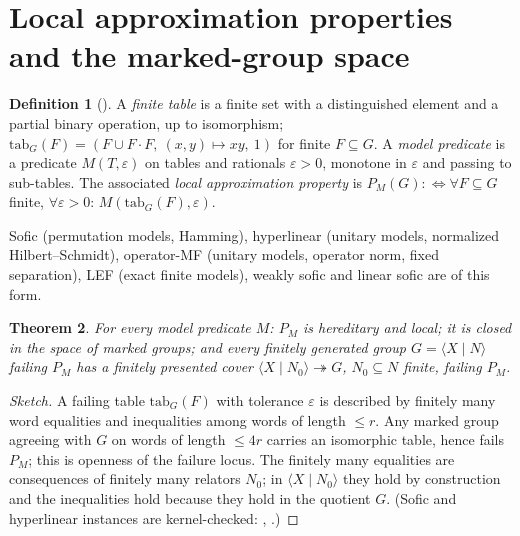 \documentclass[11pt]{article}
\newtheorem{theorem}{Theorem}[section]
\theoremstyle{definition}
\newtheorem{definition}[theorem]{Definition}
\begin{document}
\section{Local approximation properties and the marked-group space}
\begin{definition}[]
A \emph{finite table} is a finite set with a distinguished element and a partial binary operation, up to isomorphism; $\mathrm{tab}_G(F)=(F\cup F\!\cdot\! F,\ (x,y)\mapsto xy,\ 1)$ for finite $F\subseteq G$. A \emph{model predicate} is a predicate $M(T,\varepsilon)$ on tables and rationals $\varepsilon>0$, monotone in $\varepsilon$ and passing to sub-tables. The associated \emph{local approximation property} is $P_M(G):\iff \forall F\subseteq G$ finite, $\forall \varepsilon>0$: $M(\mathrm{tab}_G(F),\varepsilon)$.
\end{definition}
Sofic (permutation models, Hamming), hyperlinear (unitary models, normalized Hilbert--Schmidt), operator-MF (unitary models, operator norm, fixed separation), LEF (exact finite models), weakly sofic and linear sofic are of this form.
\begin{theorem}\label{thm:closed}
For every model predicate $M$: $P_M$ is hereditary and local; it is closed in the space of marked groups; and every finitely generated group $G=\langle X\mid N\rangle$ failing $P_M$ has a finitely presented cover $\langle X\mid N_0\rangle\twoheadrightarrow G$, $N_0\subseteq N$ finite, failing $P_M$.
\end{theorem}
\begin{proof}[Sketch]
A failing table $\mathrm{tab}_G(F)$ with tolerance $\varepsilon$ is described by finitely many word equalities and inequalities among words of length $\le r$. Any marked group agreeing with $G$ on words of length $\le 4r$ carries an isomorphic table, hence fails $P_M$; this is openness of the failure locus. The finitely many equalities are consequences of finitely many relators $N_0$; in $\langle X\mid N_0\rangle$ they hold by construction and the inequalities hold because they hold in the quotient $G$. (Sofic and hyperlinear instances are kernel-checked: , .)
\end{proof}
\end{document}
